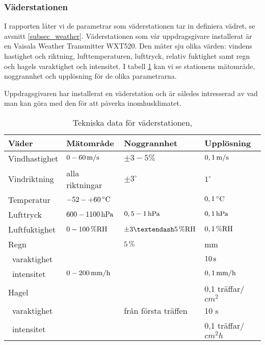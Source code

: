 \subsubsection{Väderstationen}
\label{subsubsec_weathertransmitter}
I rapporten låter vi de parametrar som väderstationen tar in definiera vädret, se avsnitt \ref{subsec_weather}. Väderstationen som vår uppdragsgivare installerat är en Vaisala Weather Transmitter WXT520. Den mäter sju olika värden: vindens hastighet och riktning, lufttemperaturen, lufttryck, relativ fuktighet samt regn och hagels varaktighet och intensitet. I tabell \ref{tbl:weathertransmitter} kan vi se stationens mätområde, noggrannhet och upplösning för de olika parametrarna.

Uppdragsgivaren har installerat en väderstation och är således intresserad av vad man kan göra med den för att påverka inomhusklimatet.

\begin{table}[htdp]
\caption{Tekniska data för väderstationen, \cite{datasheet_weathertransmitter}}
\begin{center}
\begin{tabular}{|l | l l l|}
\hline
\textbf{Väder} & \textbf{Mätområde} %
 & \textbf{Noggrannhet} %
 & \textbf{Upplösning} \\ %
\hline
\rule{0pt}{3ex}Vindhastighet & $\unit[0-60]{m/s}$ & $\pm 3-5\%$ & $\unit[0,1]{m/s}$ \\ 
\rule{0pt}{3ex}Vindriktning & alla riktningar & $\pm 3^{\circ}$ & $1^{\circ}$ \\
\rule{0pt}{3ex}Temperatur & $\unit[-52-+60]{^{\circ}C}$ & & $\unit[0,1]{^{\circ}C}$ \\
\rule{0pt}{3ex}Lufttryck & $\unit[600-1100]{hPa}$ & $\unit[0,5-1]{hPa}$ & $\unit[0,1]{hPa}$ \\
\rule{0pt}{3ex}Luftfuktighet & $\unit[0-100]{\%RH}$ & $\unit[\pm3–5]{\%RH}$ & $\unit[0,1]{\%RH}$ \\
\rule{0pt}{3ex}Regn &  & $\unit[5]{\%}$ & \unit[0,01]{mm} \\
~varaktighet & & & $\unit[10]{s}$\\
~intensitet & $\unit[0-200]{mm/h}$ & & $\unit[0,1]{mm/h}$ \\
\rule{0pt}{3ex}Hagel &  &  & 0,1 träffar/$\unit{cm^2}$ \\
~varaktighet & & från första träffen & 10 s\\
~intensitet & & & 0,1 träffar/$\unit{cm^2h}$\\
\hline
\end{tabular}
\end{center}
\label{tbl:weathertransmitter}
\end{table}
